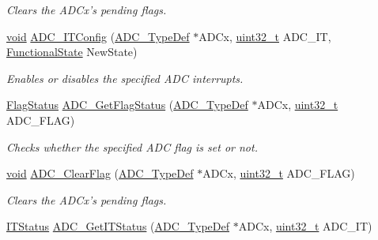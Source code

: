\begin{DoxyCompactItemize}
\begin{DoxyCompactList}\small\item\em Clears the A\-D\-Cx's pending flags. \end{DoxyCompactList}\item 
\hyperlink{group___n_a_m_e_ga18028b8badbf1ea7e704ccac3c488e82}{void} \hyperlink{group___a_d_c___exported___constants_gac7b249ea837a268a33e1275af687741f}{A\-D\-C\-\_\-\-I\-T\-Config} (\hyperlink{struct_a_d_c___type_def}{A\-D\-C\-\_\-\-Type\-Def} $\ast$A\-D\-Cx, \hyperlink{stdint_8h_a435d1572bf3f880d55459d9805097f62}{uint32\-\_\-t} A\-D\-C\-\_\-\-I\-T, \hyperlink{group___exported__types_gac9a7e9a35d2513ec15c3b537aaa4fba1}{Functional\-State} New\-State)
\begin{DoxyCompactList}\small\item\em Enables or disables the specified A\-D\-C interrupts. \end{DoxyCompactList}\item 
\hyperlink{group___exported__types_ga89136caac2e14c55151f527ac02daaff}{Flag\-Status} \hyperlink{group___a_d_c___exported___constants_gacdb78c0ff9fd7ca76053693fa73b1c89}{A\-D\-C\-\_\-\-Get\-Flag\-Status} (\hyperlink{struct_a_d_c___type_def}{A\-D\-C\-\_\-\-Type\-Def} $\ast$A\-D\-Cx, \hyperlink{stdint_8h_a435d1572bf3f880d55459d9805097f62}{uint32\-\_\-t} A\-D\-C\-\_\-\-F\-L\-A\-G)
\begin{DoxyCompactList}\small\item\em Checks whether the specified A\-D\-C flag is set or not. \end{DoxyCompactList}\item 
\hyperlink{group___n_a_m_e_ga18028b8badbf1ea7e704ccac3c488e82}{void} \hyperlink{group___a_d_c___exported___constants_ga6b545df37b29b49ea8f1c97b266dbe92}{A\-D\-C\-\_\-\-Clear\-Flag} (\hyperlink{struct_a_d_c___type_def}{A\-D\-C\-\_\-\-Type\-Def} $\ast$A\-D\-Cx, \hyperlink{stdint_8h_a435d1572bf3f880d55459d9805097f62}{uint32\-\_\-t} A\-D\-C\-\_\-\-F\-L\-A\-G)
\begin{DoxyCompactList}\small\item\em Clears the A\-D\-Cx's pending flags. \end{DoxyCompactList}\item 
\hyperlink{group___exported__types_gaacbd7ed539db0aacd973a0f6eca34074}{I\-T\-Status} \hyperlink{group___a_d_c___exported___constants_ga88deafe1370dc07018064437e8a07069}{A\-D\-C\-\_\-\-Get\-I\-T\-Status} (\hyperlink{struct_a_d_c___type_def}{A\-D\-C\-\_\-\-Type\-Def} $\ast$A\-D\-Cx, \hyperlink{stdint_8h_a435d1572bf3f880d55459d9805097f62}{uint32\-\_\-t} A\-D\-C\-\_\-\-I\-T)

\end{DoxyCompactItemize}
